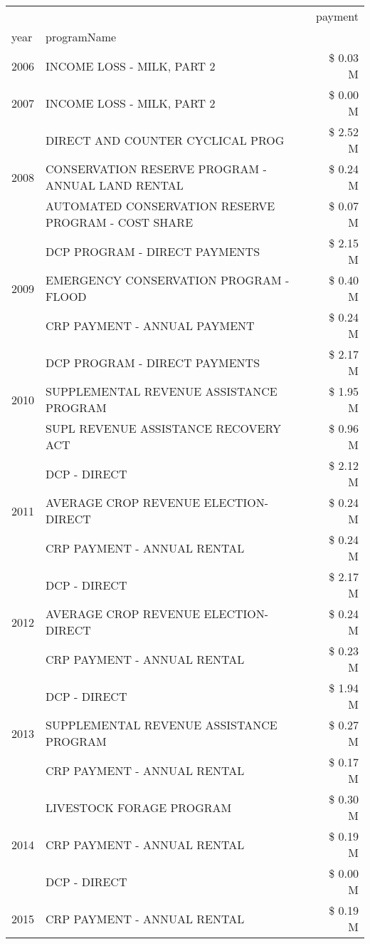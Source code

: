 \begin{tabular}{llr}
\toprule
 &  & payment \\
year & programName &  \\
\midrule
2006 & INCOME LOSS - MILK, PART 2 & \$ 0.03 M \\
\cline{1-3}
2007 & INCOME LOSS - MILK, PART 2 & \$ 0.00 M \\
\cline{1-3}
\multirow[t]{3}{*}{2008} & DIRECT AND COUNTER CYCLICAL PROG & \$ 2.52 M \\
 & CONSERVATION RESERVE PROGRAM - ANNUAL LAND RENTAL & \$ 0.24 M \\
 & AUTOMATED CONSERVATION RESERVE PROGRAM - COST SHARE & \$ 0.07 M \\
\cline{1-3}
\multirow[t]{3}{*}{2009} & DCP PROGRAM - DIRECT PAYMENTS & \$ 2.15 M \\
 & EMERGENCY CONSERVATION PROGRAM - FLOOD & \$ 0.40 M \\
 & CRP PAYMENT - ANNUAL PAYMENT & \$ 0.24 M \\
\cline{1-3}
\multirow[t]{3}{*}{2010} & DCP PROGRAM - DIRECT PAYMENTS & \$ 2.17 M \\
 & SUPPLEMENTAL REVENUE ASSISTANCE PROGRAM & \$ 1.95 M \\
 & SUPL REVENUE ASSISTANCE RECOVERY ACT & \$ 0.96 M \\
\cline{1-3}
\multirow[t]{3}{*}{2011} & DCP - DIRECT & \$ 2.12 M \\
 & AVERAGE CROP REVENUE ELECTION-DIRECT & \$ 0.24 M \\
 & CRP PAYMENT - ANNUAL RENTAL & \$ 0.24 M \\
\cline{1-3}
\multirow[t]{3}{*}{2012} & DCP - DIRECT & \$ 2.17 M \\
 & AVERAGE CROP REVENUE ELECTION-DIRECT & \$ 0.24 M \\
 & CRP PAYMENT - ANNUAL RENTAL & \$ 0.23 M \\
\cline{1-3}
\multirow[t]{3}{*}{2013} & DCP - DIRECT & \$ 1.94 M \\
 & SUPPLEMENTAL REVENUE ASSISTANCE PROGRAM & \$ 0.27 M \\
 & CRP PAYMENT - ANNUAL RENTAL & \$ 0.17 M \\
\cline{1-3}
\multirow[t]{3}{*}{2014} & LIVESTOCK FORAGE PROGRAM & \$ 0.30 M \\
 & CRP PAYMENT - ANNUAL RENTAL & \$ 0.19 M \\
 & DCP - DIRECT & \$ 0.00 M \\
\cline{1-3}
\multirow[t]{3}{*}{2015} & CRP PAYMENT - ANNUAL RENTAL & \$ 0.19 M \\

\end{tabular}
